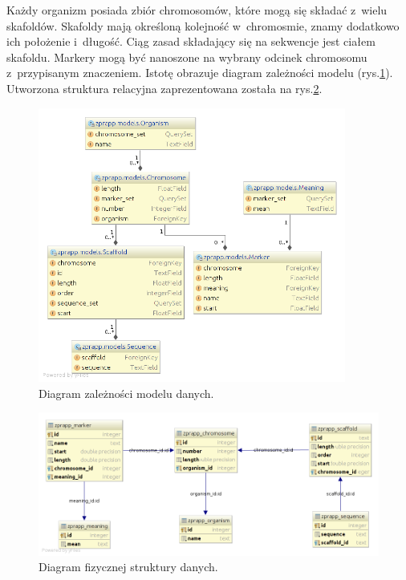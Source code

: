 \documentclass[a4paper,12pt,oneside]{mwrep}  %
\begin{document}
Każdy organizm posiada zbiór chromosomów, które mogą się składać z~wielu skafoldów. Skafoldy mają określoną kolejność w~chromosmie, znamy dodatkowo ich położenie i~długość. Ciąg zasad składający się na sekwencje jest ciałem skafoldu. Markery mogą być nanoszone na wybrany odcinek chromosomu z~przypisanym znaczeniem. Istotę obrazuje diagram zależności modelu (rys.\ref{diagram_zaleznosci_modelu}). Utworzona struktura relacyjna zaprezentowana została na rys.\ref{diagram_fizycznej_struktury}.
\begin{figure}[h]
\centering
\includegraphics[width=0.9\textwidth]{grafika/model/final/model_diagram_zaleznosci_rozszerzony.png}
\caption{Diagram zależności modelu danych.}
\label{diagram_zaleznosci_modelu}
\end{figure}

\begin{figure}[h]
\centering
\includegraphics[width=1\textwidth]{grafika/diagram_bazy.png}
\caption{Diagram fizycznej struktury danych.}
\label{diagram_fizycznej_struktury}
\end{figure}
\end{document}

